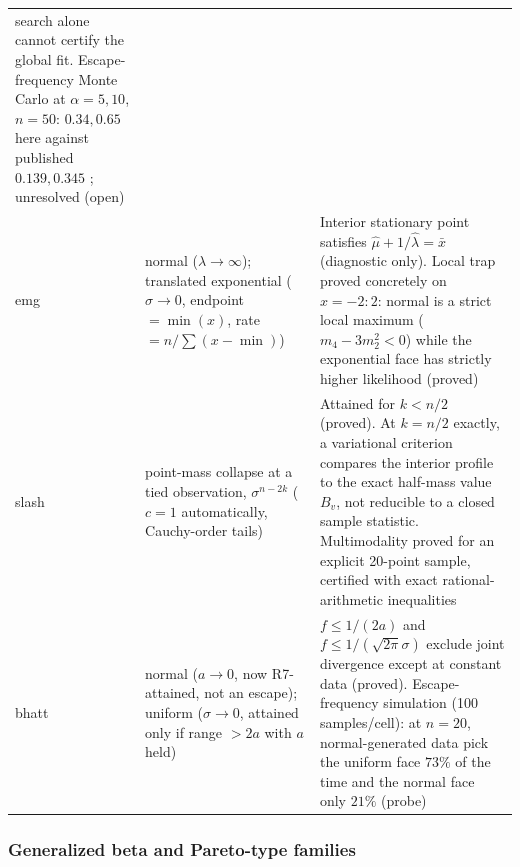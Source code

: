 \documentclass[11pt]{article}
\theoremstyle{plain}
\theoremstyle{definition}
\theoremstyle{remark}
\begin{document}
\begin{center}
\begin{tabular}{@{}l p{4.2cm} p{8.2cm}@{}}
  search alone cannot certify the global fit. Escape-frequency Monte Carlo
  at $\alpha=5,10$, $n=50$: $0.34,0.65$ here against published $0.139,0.345$
  \cite{azzalini1985,sartori2006}; unresolved (open) \\
emg & normal ($\lambda\to\infty$); translated exponential ($\sigma\to0$,
  endpoint $=\min(x)$, rate $=n/\sum(x-\min)$) &
  Interior stationary point satisfies $\hat\mu+1/\hat\lambda=\bar x$
  (diagnostic only). Local trap proved concretely on $x=-2{:}2$: normal is
  a strict local maximum ($m_4-3m_2^2<0$) while the exponential face has
  strictly higher likelihood (proved) \\
slash & point-mass collapse at a tied observation, $\sigma^{n-2k}$
  ($c=1$ automatically, Cauchy-order tails) &
  Attained for $k<n/2$ (proved). At $k=n/2$ exactly, a variational
  criterion compares the interior profile to the exact half-mass value
  $B_v$, not reducible to a closed sample statistic. Multimodality proved
  for an explicit 20-point sample, certified with exact rational-arithmetic
  inequalities \\
bhatt & normal ($a\to0$, now R7-attained, not an escape); uniform
  ($\sigma\to0$, attained only if range $>2a$ with $a$ held) &
  $f\le1/(2a)$ and $f\le1/(\sqrt{2\pi}\sigma)$ exclude joint divergence
  except at constant data (proved). Escape-frequency simulation (100
  samples/cell): at $n=20$, normal-generated data pick the uniform face
  $73\%$ of the time and the normal face only $21\%$ (probe) \\
\bottomrule
\end{tabular}
\end{center}

\subsubsection*{Generalized beta and Pareto-type families}
\end{document}

